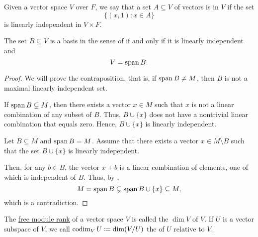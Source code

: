 \begin{definition}\label{affine_independence}
  Given a vector space \( V \) over \( F \), we say that a set \( A \subseteq V \) of vectors is  in \( V \) if the set
  \begin{equation*}
    \{ (x, 1) \colon x \in A \}
  \end{equation*}
  is linearly independent in \( V \times F \).
\end{definition}

\begin{proposition}\label{thm:vector_space_basis}
  The set \( B \subseteq V \) is a basis in the sense of  if and only if it is linearly independent and
  \begin{equation*}
    V = \operatorname{span}{B}.
  \end{equation*}
\end{proposition}
\begin{proof}
  \SufficiencySubProof We will prove the contraposition, that is, if \( \operatorname{span}{B} \neq M \), then \( B \) is not a maximal linearly independent set.

  If \( \operatorname{span}{B} \subsetneq M \), then there exists a vector \( x \in M \) such that \( x \) is not a linear combination of any subset of \( B \). Thus, \( B \cup \{ x \} \) does not have a nontrivial linear combination that equals zero. Hence, \( B \cup \{ x \} \) is linearly independent.

  \NecessitySubProof Let \( B \subseteq M \) and \( \operatorname{span}{B} = M \). Assume that there exists a vector \( x \in M \setminus B \) such that the set \( B \cup \{ x \} \) is linearly independent.

  Then, for any \( b \in B \), the vector \( x + b \) is a linear combination of elements, one of which is independent of \( B \). Thus, by ,
  \begin{equation*}
    M = \operatorname{span}{B} \subsetneq \operatorname{span}{B \cup \{ x \}} \subseteq M,
  \end{equation*}
  which is a contradiction.
\end{proof}

\begin{definition}\label{def:vector_space_dimension}
  The \hyperref[def:free_semimodule]{free module rank} of a vector space \( V \) is called the  \( \dim V \) of \( V \). If \( U \) is a vector subspace of \( V \), we call \( \operatorname*{co\negthinspace\dim}_V U \coloneqq \dim(V/U) \) the  of \( U \) relative to \( V \).
\end{definition}

